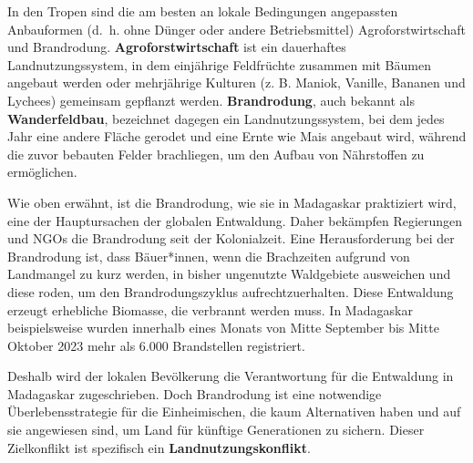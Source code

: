 \documentclass[
  nswissgerman,
  a4paper,
  openany]{book}
\begin{document}
\begin{tcolorbox}[enhanced jigsaw, arc=.35mm, bottomrule=.15mm, bottomtitle=1mm, breakable, colback=white, colbacktitle=quarto-callout-tip-color!10!white, colframe=quarto-callout-tip-color-frame, coltitle=black, left=2mm, leftrule=.75mm, opacityback=0, opacitybacktitle=0.6, rightrule=.15mm, title={Landnutzungsveränderungen in den Tropen: das Beispiel Madagaskar}, titlerule=0mm, toprule=.15mm, toptitle=1mm]

In den Tropen sind die am besten an lokale Bedingungen angepassten
Anbauformen (d.~h. ohne Dünger oder andere Betriebsmittel)
Agroforstwirtschaft und Brandrodung. \textbf{Agroforstwirtschaft} ist
ein dauerhaftes Landnutzungssystem, in dem einjährige Feldfrüchte
zusammen mit Bäumen angebaut werden oder mehrjährige Kulturen (z. B.
Maniok, Vanille, Bananen und Lychees) gemeinsam gepflanzt werden.
\textbf{Brandrodung}, auch bekannt als \textbf{Wanderfeldbau},
bezeichnet dagegen ein Landnutzungssystem, bei dem jedes Jahr eine
andere Fläche gerodet und eine Ernte wie Mais angebaut wird, während die
zuvor bebauten Felder brachliegen, um den Aufbau von Nährstoffen zu
ermöglichen.

Wie oben erwähnt, ist die Brandrodung, wie sie in Madagaskar praktiziert
wird, eine der Hauptursachen der globalen Entwaldung. Daher bekämpfen
Regierungen und NGOs die Brandrodung seit der Kolonialzeit. Eine
Herausforderung bei der Brandrodung ist, dass Bäuer*innen, wenn die
Brachzeiten aufgrund von Landmangel zu kurz werden, in bisher ungenutzte
Waldgebiete ausweichen und diese roden, um den Brandrodungszyklus
aufrechtzuerhalten. Diese Entwaldung erzeugt erhebliche Biomasse, die
verbrannt werden muss. In Madagaskar beispielsweise wurden innerhalb
eines Monats von Mitte September bis Mitte Oktober 2023 mehr als 6.000
Brandstellen registriert.

Deshalb wird der lokalen Bevölkerung die Verantwortung für die
Entwaldung in Madagaskar zugeschrieben. Doch Brandrodung ist eine
notwendige Überlebensstrategie für die Einheimischen, die kaum
Alternativen haben und auf sie angewiesen sind, um Land für künftige
Generationen zu sichern. Dieser Zielkonflikt ist spezifisch ein
\textbf{Landnutzungskonflikt}.

\end{tcolorbox}
\end{document}
